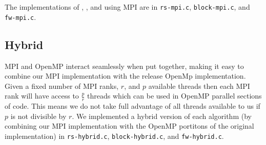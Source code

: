 The implementations of \rs{}, \block{}, and \fw{} using MPI are in
\texttt{rs-mpi.c}, \texttt{block-mpi.c}, and \texttt{fw-mpi.c}.

\subsection{Hybrid}
MPI and OpenMP interact seamlessly when put together, making it easy to combine
our MPI implementation with the release OpenMp implementation. Given a fixed
number of MPI ranks, $r$, and $p$ available threads then each MPI rank will
have access to $\frac{p}{r}$ threads which can be used in OpenMP parallel
sections of code. This means we do not take full advantage of all threads
available to us if $p$ is not divisible by $r$. We implemented a hybrid version
of each algorithm (by combining our MPI implementation with the OpenMP
portitons of the original implementation) in \texttt{rs-hybrid.c},
\texttt{block-hybrid.c}, and \texttt {fw-hybrid.c}.
